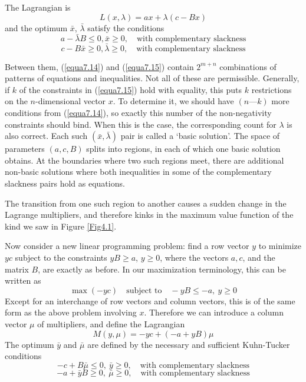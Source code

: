 The Lagrangian is 
\begin{equation} \label{equa7.13}
 L(x, \lambda) = ax + \lambda (c - Bx)
\end{equation}
and the optimum $\bar{x}$, $\bar{\lambda}$ satisfy the conditions
\begin{equation} \label{equa7.14}
 a - \bar{\lambda} B \leq 0, \bar{x} \geq 0, \quad \mbox{with complementary slackness}
\end{equation}
\begin{equation} \label{equa7.15}
 c - B \bar{x}  \geq 0, \bar{\lambda} \geq 0, \quad \mbox{with complementary slackness}
\end{equation}

Between them, (\ref{equa7.14}) and (\ref{equa7.15}) contain $2^{m+n}$ combinations of patterns of equations and inequalities. Not all of these are permissible. Generally, if $k$ of the constraints in (\ref{equa7.15}) hold with equality, this puts $k$ restrictions on the $n$-dimensional vector $x$. To determine it, we should have $(n—k)$ more conditions from (\ref{equa7.14}), so exactly this number of the non-negativity constraints should bind. When this is the case, the corresponding count for $\lambda$ is also correct. Each such $(\bar{x}, \bar{\lambda})$ pair is called a `basic solution'. The space of parameters $(a,c, B)$ splits into regions, in each of which one basic solution obtains. At the boundaries where two such regions meet, there are additional non-basic solutions where both inequalities in some of the complementary slackness pairs hold as equations.

The transition from one such region to another causes a sudden change in the Lagrange multipliers, and therefore kinks in the maximum value function of the kind we saw in Figure \ref{Fig4.1}.

Now consider a new linear programming problem: find a row vector $y$ to minimize $yc$ subject to the constraints $y B \geq a$, $y \geq 0$, where the vectors $a, c$, and the matrix $B$, are exactly as before. In our maximization terminology, this can be written as
\begin{equation*}
\max (-yc) \quad \mbox{subject to} \quad -yB \leq -a, \ y \geq 0
\end{equation*}
Except for an interchange of row vectors and column vectors, this is of the same form as the above problem involving $x$. Therefore we can introduce a column vector $\mu$ of multipliers, and define the Lagrangian
\begin{equation} \label{equa7.16}
M(y, \mu) = -yc + (-a +yB)\mu 
\end{equation}
The optimum $\bar{y}$ and $\bar{\mu}$ are defined by the necessary and sufficient Kuhn-Tucker conditions
\begin{equation} \label{equa7.17}
  -c + B\bar{\mu} \leq 0, \  \bar{y} \geq 0, \quad \mbox{with complementary slackness}
\end{equation}
\begin{equation} \label{equa7.18}
  -a + \bar{y} B \geq 0, \  \bar{\mu} \geq 0, \quad \mbox{with complementary slackness}
\end{equation}

